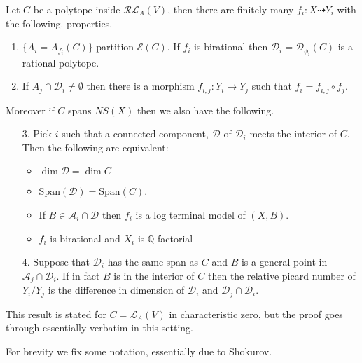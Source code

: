 \documentclass[a4paper,12pt]{amsart}
\begin{document}
	\begin{theorem}\label{assumptions}\cite[Theorem 3.3]{hacon2009sarkisov}
		Let $C$ be a polytope inside $\mathcal{RL}_{A}(V)$, then there are finitely many $f_{i}:X \dashrightarrow Y_{i}$ with the following. properties.
		
		\begin{enumerate}
			\item $\{A_{i}=A_{f_{i}}(C)\}$ partition $\mathcal{E}(C)$. If $f_{i}$ is birational then $\mathcal{D}_{i}=\mathcal{D}_{\phi_{i}}(C)$ is a rational polytope.
			\item If $A_{j} \cap \mathcal{D}_{i} \neq \emptyset$ then there is a morphism $f_{i,j}:Y_{i} \to Y_{j}$ such that $f_{i}=f_{i,j} \circ f_{j}$.
		\end{enumerate}
		
		Moreover if $C$ spans $NS(X)$ then we also have the following.
		
		\begin{enumerate}
			\item[3.] Pick $i$ such that a connected component, $\mathcal{D}$ of $\mathcal{D}_{i}$ meets the interior of $C$. Then the following are equivalent:
			\begin{itemize}
				\item $\dim \mathcal{D}= \dim C$
				\item $\text{Span}(\mathcal{D})=\text{Span}(C)$.
				\item If $B \in \mathcal{A}_{i} \cap \mathcal{D}$ then $f_{i}$ is a log terminal model of $(X,B)$.
				\item $f_{i}$ is birational and $X_{i}$ is $\mathbb{Q}$-factorial
			\end{itemize} 
			
			\item[4.] Suppose that $\mathcal{D}_{i}$ has the same span as $C$ and $B$ is a general point in $\mathcal{A}_{j} \cap \mathcal{D}_{i}$. If in fact $B$ is in the interior of $C$ then the relative picard number of $Y_{i}/Y_{j}$ is the difference in dimension of $\mathcal{D}_{i}$ and $\mathcal{D}_{j} \cap \mathcal{D}_{i}$. 
			
		\end{enumerate}
	\end{theorem}
	
	This result is stated for $C=\mathcal{L}_{A}(V)$ in characteristic zero, but the proof goes through essentially verbatim in this setting.
	
	For brevity we fix some notation, essentially due to Shokurov.
	
\end{document}
